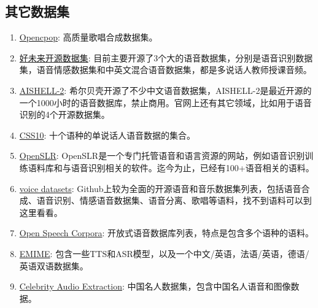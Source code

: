 \documentclass[cn,10pt,math=newtx,citestyle=gb7714-2015,bibstyle=gb7714-2015]{elegantbook}
\begin{document}
\subsection{其它数据集}
\begin{enumerate}
  \item \href{https://wenet.org.cn/opencpop}{Opencpop}: 高质量歌唱合成数据集。
  \item \href{https://ai.100tal.com/dataset}{好未来开源数据集}: 目前主要开源了3个大的语音数据集，分别是语音识别数据集，语音情感数据集和中英文混合语音数据集，都是多说话人教师授课音频。
  \item \href{http://www.aishelltech.com/aishell_2}{AISHELL-2}: 希尔贝壳开源了不少中文语音数据集，AISHELL-2是最近开源的一个1000小时的语音数据库，禁止商用。官网上还有其它领域，比如用于语音识别的4个开源数据集。
  \item \href{https://github.com/Kyubyong/css10}{CSS10}: 十个语种的单说话人语音数据的集合。
  \item \href{https://www.openslr.org/resources.php}{OpenSLR}: OpenSLR是一个专门托管语音和语言资源的网站，例如语音识别训练语料库和与语音识别相关的软件。迄今为止，已经有100+语音相关的语料。
  \item \href{https://github.com/jim-schwoebel/voice_datasets}{voice datasets}: Github上较为全面的开源语音和音乐数据集列表，包括语音合成、语音识别、情感语音数据集、语音分离、歌唱等语料，找不到语料可以到这里看看。
  \item \href{https://github.com/JRMeyer/open-speech-corpora}{Open Speech Corpora}: 开放式语音数据库列表，特点是包含多个语种的语料。
  \item \href{https://www.emime.org/participate.html}{EMIME}: 包含一些TTS和ASR模型，以及一个中文/英语，法语/英语，德语/英语双语数据集。
  \item \href{https://github.com/celebrity-audio-collection/videoprocess}{Celebrity Audio Extraction}: 中国名人数据集，包含中国名人语音和图像数据。
\end{enumerate}
\end{document}

